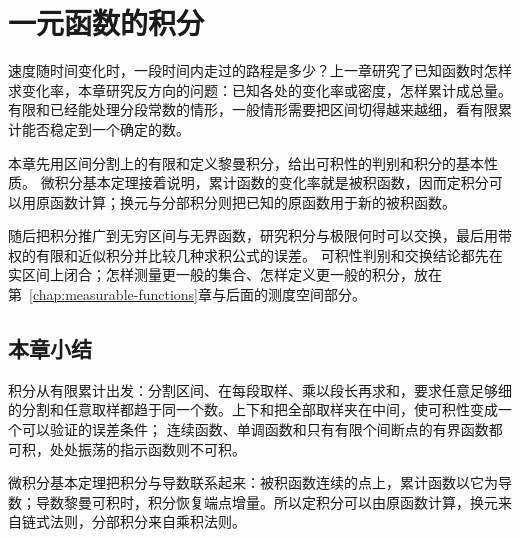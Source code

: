 \chapter{一元函数的积分}
\label{chap:univariate-integration}

速度随时间变化时，一段时间内走过的路程是多少？上一章研究了已知函数时怎样求变化率，本章研究反方向的问题：已知各处的变化率或密度，怎样累计成总量。
有限和已经能处理分段常数的情形，一般情形需要把区间切得越来越细，看有限累计能否稳定到一个确定的数。

本章先用区间分割上的有限和定义黎曼积分，给出可积性的判别和积分的基本性质。
微积分基本定理接着说明，累计函数的变化率就是被积函数，因而定积分可以用原函数计算；换元与分部积分则把已知的原函数用于新的被积函数。

随后把积分推广到无穷区间与无界函数，研究积分与极限何时可以交换，最后用带权的有限和近似积分并比较几种求积公式的误差。
可积性判别和交换结论都先在实区间上闭合；怎样测量更一般的集合、怎样定义更一般的积分，放在第~\ref{chap:measurable-functions}章与后面的测度空间部分。








\FloatBarrier
\section{本章小结}
\label{sec:ru-integration-summary}

积分从有限累计出发：分割区间、在每段取样、乘以段长再求和，要求任意足够细的分割和任意取样都趋于同一个数。上下和把全部取样夹在中间，使可积性变成一个可以验证的误差条件；
连续函数、单调函数和只有有限个间断点的有界函数都可积，处处振荡的指示函数则不可积。

微积分基本定理把积分与导数联系起来：被积函数连续的点上，累计函数以它为导数；导数黎曼可积时，积分恢复端点增量。所以定积分可以由原函数计算，换元来自链式法则，分部积分来自乘积法则。

